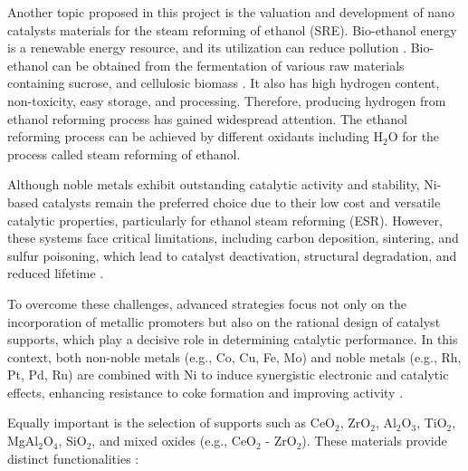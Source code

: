 Another topic proposed in this project is the valuation and development of nano catalysts materials for the steam reforming of ethanol (SRE). Bio-ethanol energy is a renewable energy resource, and its utilization can reduce pollution \cite{FENG2023}.  Bio-ethanol can be obtained from the fermentation of various raw materials containing sucrose, and cellulosic biomass \cite{Tripodi2018}. It also has high hydrogen content, non-toxicity, easy storage, and processing. Therefore, producing hydrogen from ethanol reforming process has gained widespread attention. The ethanol reforming process can be achieved by different oxidants \cite{FENG2023} including H$_2$O for the process called steam reforming of ethanol. 




Although noble metals exhibit outstanding catalytic activity and stability, Ni-based catalysts remain the preferred choice due to their low cost and versatile catalytic properties, particularly for ethanol steam reforming (ESR). However, these systems face critical limitations, including carbon deposition, sintering, and sulfur poisoning, which lead to catalyst deactivation, structural degradation, and reduced lifetime \cite{SHI2025}.

To overcome these challenges, advanced strategies focus not only on the incorporation of metallic promoters but also on the rational design of catalyst supports, which play a decisive role in determining catalytic performance. In this context, both non-noble metals (e.g., Co, Cu, Fe, Mo) and noble metals (e.g., Rh, Pt, Pd, Ru) are combined with Ni to induce synergistic electronic and catalytic effects, enhancing resistance to coke formation and improving activity \cite{PHUNG2020}.

Equally important is the selection of supports such as CeO$_2$, ZrO$_2$, Al$_2$O$_3$, TiO$_2$, MgAl$_2$O$_4$, SiO$_2$, and mixed oxides (e.g., CeO$_2$ - ZrO$_2$). These materials provide distinct functionalities \cite{MONDAL2015}:

